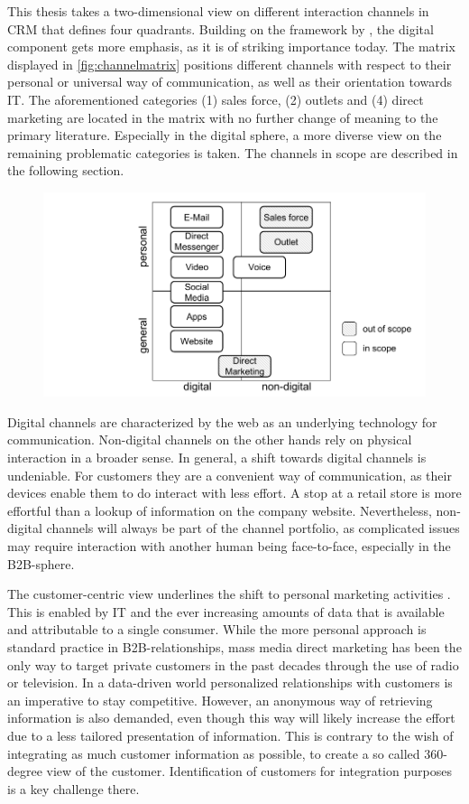		This thesis takes a two-dimensional view on different interaction channels in CRM that defines four quadrants. Building on the framework by \cite{paynefrow2005}, the digital component gets more emphasis, as it is of striking importance today. The matrix displayed in \Fig \ref{fig:channelmatrix} positions different channels with respect to their personal or universal way of communication, as well as their orientation towards IT. The aforementioned categories (1) sales force, (2) outlets and (4) direct marketing are located in the matrix with no further change of meaning to the primary literature. Especially in the digital sphere, a more diverse view on the remaining problematic categories is taken. The channels in scope are described in the following section. 
		
			\begin{figure}[caption={Channel Matrix}, label={fig:channelmatrix}]
			{	\includegraphics[width=.8\textwidth]{figures/channelmatrix.pdf}}
		\end{figure}
		
		Digital channels are characterized by the web as an underlying technology for communication. Non-digital channels on the other hands rely on physical interaction in a broader sense. In general, a shift towards digital channels is undeniable. For customers they are a convenient way of communication, as their devices enable them to do interact with less effort. A stop at a retail store is more effortful than a lookup of information on the company website. Nevertheless, non-digital channels will always be part of the channel portfolio, as complicated issues may require interaction with another human being face-to-face, especially in the B2B-sphere. 
		
		The customer-centric view underlines the shift to personal marketing activities \citep{peppers}. This is enabled by IT and the ever increasing amounts of data that is available and attributable to a single consumer. While the more personal approach is standard practice in B2B-relationships, mass media direct marketing has been the only way to target private customers in the past decades through the use of radio or television. In a data-driven world personalized relationships with customers is an imperative to stay competitive. However, an anonymous way of retrieving information is also demanded, even though this way will likely increase the effort due to a less tailored presentation of information. This is contrary to the wish of integrating as much customer information as possible, to create a so called 360-degree view of the customer. Identification of customers for integration purposes is a key challenge there. 
		
